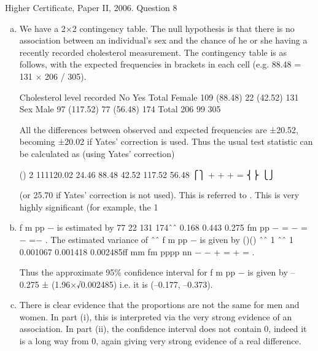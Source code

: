 \documentclass[a4paper,12pt]{article}
\begin{document}
Higher Certificate, Paper II, 2006.  Question 8 
\begin{enumerate}[(a)] 
\item  We have a 2×2 contingency table.  The null hypothesis is that there is no association between an individual's sex and the chance of he or she having a recently recorded cholesterol measurement.  The contingency table is as follows, with the expected frequencies in brackets in each cell (e.g. 88.48 = 131 × 206 / 305). 
 
  Cholesterol level recorded    No Yes Total Female 109     (88.48) 22  (42.52) 131    Sex Male   97   (117.52) 77  (56.48) 174  Total 206 99 305 
 
All the differences between observed and expected frequencies are ±20.52, becoming ±20.02 if Yates' correction is used.  Thus the usual test statistic can be calculated as (using Yates' correction) 
 
() 2 111120.02 24.46 88.48 42.52 117.52 56.48 ⎧⎫ + + + = ⎨⎬ ⎩⎭
 
 
(or 25.70 if Yates' correction is not used).  This is referred to .  This is very highly significant (for example, the 1%
 
 
\item f m pp − is estimated by 77 22 131 174ˆˆ 0.168 0.443 0.275 fm pp − = − = − =− .  The estimated variance of ˆˆ f m pp − is given by 
 ()() ˆˆ 1 ˆˆ 1 0.001067 0.001418 0.002485ff mm fm pppp nn − − + = + = . 
 
Thus the approximate 95\% confidence interval for f m pp − is given by –0.275 ± (1.96×√0.002485) i.e. it is (–0.177, –0.373). 
 
 
\item There is clear evidence that the proportions are not the same for men and women.  In part (i), this is interpreted via the very strong evidence of an association.  In part (ii), the confidence interval does not contain 0, indeed it is a long way from 0, again giving very strong evidence of a real difference. 
\end{enumerate}
\end{document}
